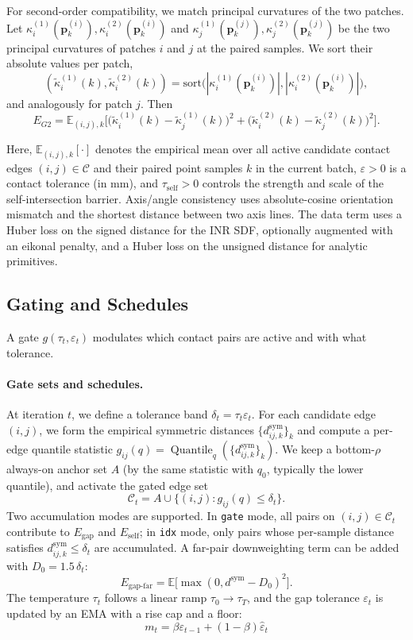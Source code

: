\documentclass{ieeeaccess}
\begin{document}
For second-order compatibility, we match principal curvatures of the two
patches. Let
$\kappa_i^{(1)}(\mathbf{p}^{(i)}_k),\kappa_i^{(2)}(\mathbf{p}^{(i)}_k)$
and
$\kappa_j^{(1)}(\mathbf{p}^{(j)}_k),\kappa_j^{(2)}(\mathbf{p}^{(j)}_k)$
be the two principal curvatures of patches $i$ and $j$ at the paired
samples. We sort their absolute values per patch,
\[
(\tilde{\kappa}_i^{(1)}(k), \tilde{\kappa}_i^{(2)}(k))
= \mathrm{sort}\bigl(|\kappa_i^{(1)}(\mathbf{p}^{(i)}_k)|,
                     |\kappa_i^{(2)}(\mathbf{p}^{(i)}_k)|\bigr),
\]
and analogously for patch $j$. Then
\begin{equation}
E_{G2}
= \mathbb{E}_{(i,j),k}\!\Big[
 \bigl(\tilde{\kappa}_i^{(1)}(k)-\tilde{\kappa}_j^{(1)}(k)\bigr)^2
+\bigl(\tilde{\kappa}_i^{(2)}(k)-\tilde{\kappa}_j^{(2)}(k)\bigr)^2
\Big].
\end{equation}

Here, $\mathbb{E}_{(i,j),k}[\cdot]$ denotes the empirical mean over all
active candidate contact edges $(i,j)\in\mathcal{C}$ and their paired
point samples $k$ in the current batch, $\varepsilon>0$ is a contact
tolerance (in mm), and $\tau_{\mathrm{self}}>0$ controls the strength
and scale of the self-intersection barrier. Axis/angle consistency uses
absolute-cosine orientation mismatch and the shortest distance between
two axis lines. The data term uses a Huber loss on the signed distance
for the INR SDF, optionally augmented with an eikonal penalty, and a
Huber loss on the unsigned distance for analytic primitives.



\subsection{Gating and Schedules}
A gate $g(\tau_t,\varepsilon_t)$ modulates which contact pairs are active and with what tolerance.

\paragraph{Gate sets and schedules.}
At iteration $t$, we define a tolerance band $\delta_t=\tau_t\varepsilon_t$. For each candidate edge $(i,j)$, we form the empirical symmetric distances $\{d^{\mathrm{sym}}_{ij,k}\}_k$ and compute a per-edge quantile statistic $g_{ij}(q)=\operatorname{Quantile}_q(\{d^{\mathrm{sym}}_{ij,k}\}_k)$. We keep a bottom-$\rho$ always-on anchor set $A$ (by the same statistic with $q_0$, typically the lower quantile), and activate the gated edge set
\[
\mathcal{C}_t = A \cup \{(i,j): g_{ij}(q)\le \delta_t\}.
\]
Two accumulation modes are supported. In \texttt{gate} mode, all pairs on $(i,j)\in\mathcal{C}_t$ contribute to $E_{\mathrm{gap}}$ and $E_{\mathrm{self}}$; in \texttt{idx} mode, only pairs whose per-sample distance satisfies $d^{\mathrm{sym}}_{ij,k}\le\delta_t$ are accumulated. A far-pair downweighting term can be added with $D_0=1.5\,\delta_t$:
\[
E_{\text{gap-far}}=\mathbb{E}\!\big[\max(0, d^{\mathrm{sym}}-D_0)^2\big].
\]
The temperature $\tau_t$ follows a linear ramp $\tau_0\!\to\!\tau_T$, and the gap tolerance $\varepsilon_t$ is updated by an EMA with a rise cap and a floor:
\[
m_t = \beta\varepsilon_{t-1} + (1-\beta)\hat{\varepsilon}_t
\]
\end{document}
